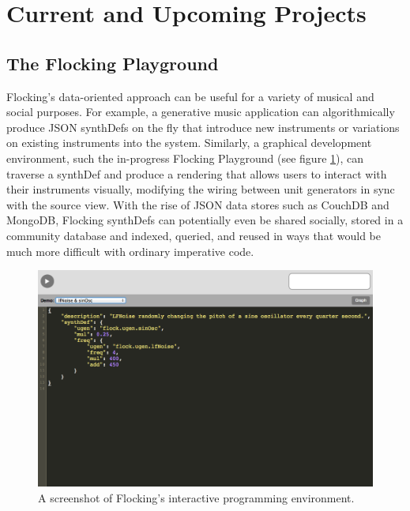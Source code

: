 \documentclass{article}
\begin{document}
\section{Current and Upcoming Projects}

\subsection{The Flocking Playground}

Flocking's data-oriented approach can be useful for a variety of musical and social purposes. For example, a generative music application can algorithmically produce JSON synthDefs on the fly that introduce new instruments or variations on existing instruments into the system. Similarly, a graphical development environment, such the in-progress Flocking Playground (see figure \ref{fig:playground}), can traverse a synthDef and produce a rendering that allows users to interact with their instruments visually, modifying the wiring between unit generators in sync with the source view. With the rise of JSON data stores such as CouchDB and MongoDB, Flocking synthDefs can potentially even be shared socially, stored in a community database and indexed, queried, and reused in ways that would be much more difficult with ordinary imperative code.

\begin{figure}[ht]
\centering
\includegraphics[width=0.9\columnwidth]{images/flocking-playground-source-view.png}
\caption{ A screenshot of Flocking's interactive programming environment.\label{fig:playground}}
\end{figure}
\end{document}
